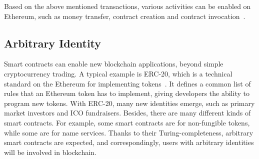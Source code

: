 



Based on the above mentioned transactions, various activities can be enabled on Ethereum, such as money transfer, contract creation and contract invocation~\cite{chen2018infocom}.


\subsection{Arbitrary Identity}
Smart contracts can enable new blockchain applications, beyond simple cryptocurrency trading. A typical example is ERC-20, which is a technical standard on the Ethereum for implementing tokens~\cite{erc-20-wiki}. It defines a common list of rules that an Ethereum token has to implement, giving developers the ability to program new tokens. With ERC-20, many new identities emerge, such as primary market investors and ICO fundraisers. Besides, there are many different kinds of smart contracts. For example, some smart contracts are for non-fungible tokens, while some are for name services. Thanks to their Turing-completeness, arbitrary smart contracts are expected, and correspondingly, users with arbitrary identities will be involved in blockchain.

